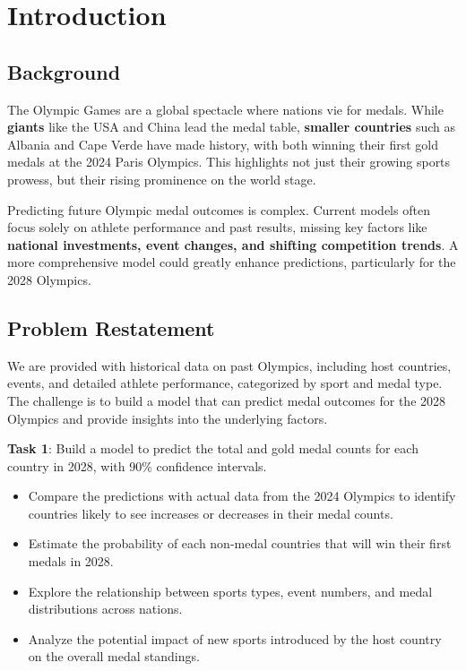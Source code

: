 \documentclass{mcmthesis}  %
\begin{document}
\tableofcontents  %
\newpage %
\section{Introduction}
\subsection{Background}
The Olympic Games are a global spectacle where nations vie for medals. While \textbf{giants} like the USA and China lead the medal table, \textbf{smaller countries} such as Albania and Cape Verde have made history, with both winning their first gold medals at the 2024 Paris Olympics. This highlights not just their growing sports prowess, but their rising prominence on the world stage.

Predicting future Olympic medal outcomes is complex. Current models often focus solely on athlete performance and past results, missing key factors like \textbf{national investments, event changes, and shifting competition trends}. A more comprehensive model could greatly enhance predictions, particularly for the 2028 Olympics.
\subsection{Problem Restatement}
We are provided with historical data on past Olympics, including host countries, events, and detailed athlete performance, categorized by sport and medal type. The challenge is to build a model that can predict medal outcomes for the 2028 Olympics and provide insights into the underlying factors.

\textbf{Task 1}: Build a model to predict the total and gold medal counts for each country in 2028, with 90\% confidence intervals.
\begin{itemize}
    \item Compare the predictions with actual data from the 2024 Olympics to identify countries likely to see increases or decreases in their medal counts.
    \item Estimate the probability of each non-medal countries that will win their first medals in 2028.
    \item Explore the relationship between sports types, event numbers, and medal distributions across nations.
    \item Analyze the potential impact of new sports introduced by the host country on the overall medal standings.
\end{itemize}
\end{document}
